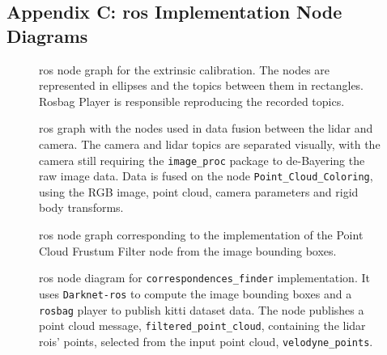 \begin{landscape}
\section{Appendix C: \acs{ros} Implementation Node Diagrams} 
\label{appendix:appendix-diagrams}

\begin{figure}[!ht]
	\centering
	\def\svgwidth{\columnwidth}
	\graphicspath{{img/calibration/}}
	
	\caption[\acs{ros} node graph for the extrinsic calibration.]{\ac{ros} node graph for the extrinsic calibration. The nodes are represented in  ellipses and the topics between them in rectangles. Rosbag Player is responsible reproducing the recorded topics.}
	\label{fig:extrinsic-calibration-rosgraph}
\end{figure}

\begin{figure}[!ht]
	\centering
	\def\svgwidth{\columnwidth}
	\graphicspath{{img/sensor_fusion/}}
		
		\caption[\acs{ros} node graph implemented for coloring the point cloud.]{\ac{ros} graph with the nodes used in data fusion between the \ac{lidar} and camera. The camera and \ac{lidar} topics are separated visually, with the camera still requiring the \texttt{image\_proc} package to de-Bayering the raw image data. Data is fused on the node \texttt{Point\_Cloud\_Coloring}, using the RGB image, point cloud, camera parameters and rigid body transforms.}
	\label{fig:sensor-fusion-rosgraph}
\end{figure}


\begin{figure}[!ht] \centering \def\svgwidth{\columnwidth}
	\graphicspath{{img/image-object-to-point-cloud/}}
	 
	\caption[\acs{ros} node graph for the point cloud frustum filter algorithm.]{\ac{ros} node graph corresponding to the implementation of the Point Cloud Frustum Filter node from the image bounding boxes.} \label{fig:ros-graph-frustum}
\end{figure}


\begin{figure}[!ht]
	\centering
	\def\svgwidth{\columnwidth}
	\graphicspath{{img/image-object-to-point-cloud/}}
		
	\caption[\acs{ros} node diagram for the estimation ob point cloud bounding box from image bounding boxes of objects of interest.]{\ac{ros} node diagram for \texttt{correspondences\_finder} implementation. It uses \texttt{Darknet-ros} to compute the image bounding boxes and a \texttt{rosbag} player to publish \ac{kitti} dataset data. The node publishes a point cloud message, \texttt{filtered\_point\_cloud}, containing the \ac{lidar} \acp{roi}' points, selected from the input point cloud, \texttt{velodyne\_points}.}
	\label{fig:correspondences-finder-standalone}
\end{figure}


\end{landscape}
